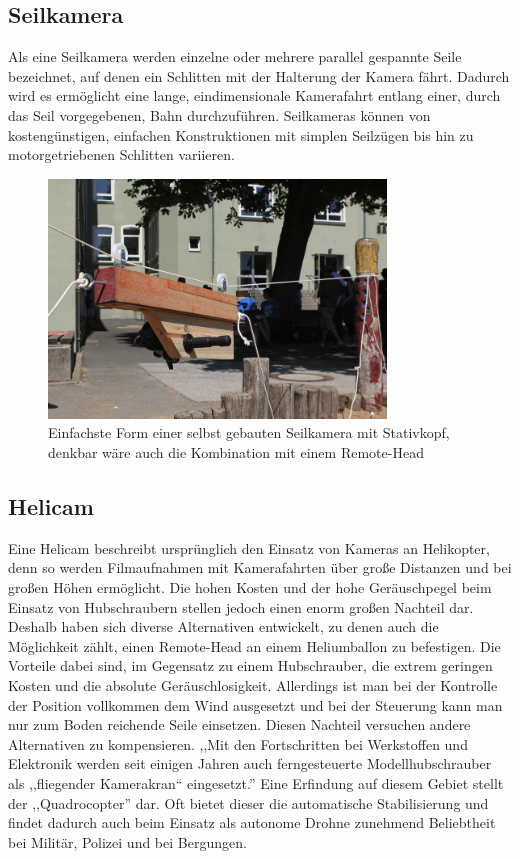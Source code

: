\documentclass[a4paper, 12pt, bibtotocnumbered, liststotocnumbered]{scrartcl}
\begin{document}
	\subsection{Seilkamera}
	Als eine Seilkamera werden einzelne oder mehrere parallel gespannte Seile bezeichnet, auf denen ein Schlitten mit der Halterung der Kamera fährt. Dadurch wird es ermöglicht eine lange, eindimensionale Kamerafahrt entlang einer, durch das Seil vorgegebenen, Bahn durchzuführen. Seilkameras können von kostengünstigen, einfachen Konstruktionen mit simplen Seilzügen bis hin zu motorgetriebenen Schlitten variieren.

	\begin{figure}[htb]
		\centering
		\includegraphics[width=0.8\textwidth]{Bilder/Seilkamera}
		\caption{Einfachste Form einer selbst gebauten Seilkamera mit Stativkopf, denkbar wäre auch die Kombination mit einem Remote-Head}
	\end{figure}

	\subsection{Helicam}
	Eine Helicam beschreibt ursprünglich den Einsatz von Kameras an Helikopter, denn so werden Filmaufnahmen mit Kamerafahrten über große Distanzen und bei großen Höhen ermöglicht. Die hohen Kosten und der hohe Geräuschpegel beim Einsatz von Hubschraubern stellen jedoch einen enorm großen Nachteil dar. Deshalb haben sich diverse Alternativen entwickelt, zu denen auch die Möglichkeit zählt, einen Remote-Head an einem Heliumballon zu befestigen. Die Vorteile dabei sind, im Gegensatz zu einem Hubschrauber, die extrem geringen Kosten und die absolute Geräuschlosigkeit. Allerdings ist man bei der Kontrolle der Position vollkommen dem Wind ausgesetzt und bei der Steuerung kann man nur zum Boden reichende Seile einsetzen. Diesen Nachteil versuchen andere Alternativen zu kompensieren. ,,Mit den Fortschritten bei Werkstoffen und Elektronik werden seit einigen Jahren auch ferngesteuerte Modellhubschrauber als ,,fliegender Kamerakran“ eingesetzt.”\cite{wikipedia-kamerakran} Eine Erfindung auf diesem Gebiet stellt der ,,Quadrocopter” dar. Oft bietet dieser die automatische Stabilisierung und findet dadurch auch beim Einsatz als autonome Drohne zunehmend Beliebtheit bei Militär, Polizei und bei Bergungen.
\end{document}
